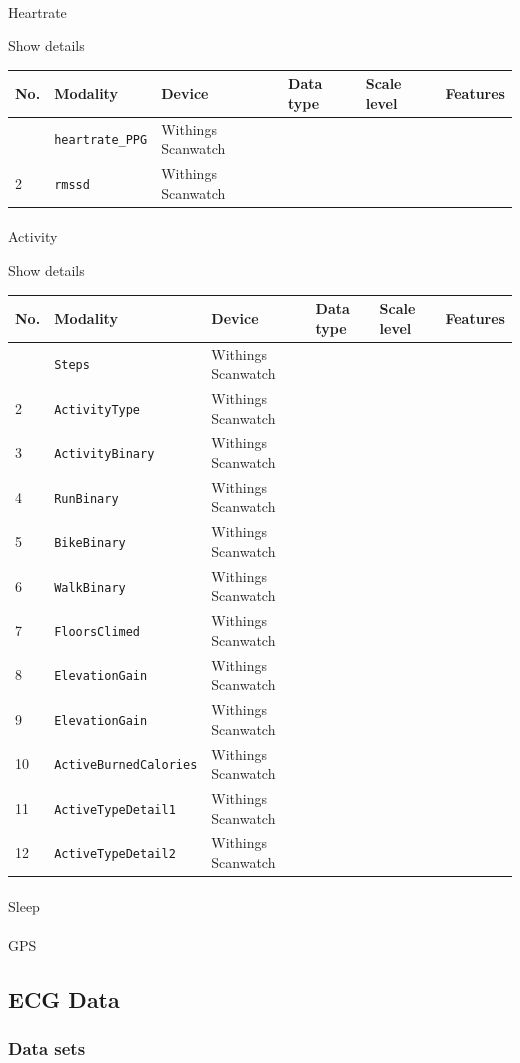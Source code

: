 \documentclass[
  letterpaper,
  DIV=11,
  numbers=noendperiod]{scrartcl}
\makeatletter
\let\oldparagraph\paragraph
\renewcommand{\paragraph}{
    \@ifstar
      \xxxParagraphStar
      \xxxParagraphNoStar
  }
\newcommand{\xxxParagraphStar}[1]{\oldparagraph*{#1}\mbox{}}
\newcommand{\xxxParagraphNoStar}[1]{\oldparagraph{#1}\mbox{}}
\makeatother
\begin{document}
\paragraph{Heartrate}\label{heartrate}

Show details

\begin{longtable}[]{@{}llllll@{}}
\toprule\noalign{}
No. & Modality & Device & Data type & Scale level & Features \\
\midrule\noalign{}
\endhead
\bottomrule\noalign{}
\endlastfoot
1 & \texttt{heartrate\_PPG} & Withings Scanwatch & & & \\
2 & \texttt{rmssd} & Withings Scanwatch & & & \\
\end{longtable}

\paragraph{Activity}\label{activity}

Show details

\begin{longtable}[]{@{}llllll@{}}
\toprule\noalign{}
No. & Modality & Device & Data type & Scale level & Features \\
\midrule\noalign{}
\endhead
\bottomrule\noalign{}
\endlastfoot
1 & \texttt{Steps} & Withings Scanwatch & & & \\
2 & \texttt{ActivityType} & Withings Scanwatch & & & \\
3 & \texttt{ActivityBinary} & Withings Scanwatch & & & \\
4 & \texttt{RunBinary} & Withings Scanwatch & & & \\
5 & \texttt{BikeBinary} & Withings Scanwatch & & & \\
6 & \texttt{WalkBinary} & Withings Scanwatch & & & \\
7 & \texttt{FloorsClimed} & Withings Scanwatch & & & \\
8 & \texttt{ElevationGain} & Withings Scanwatch & & & \\
9 & \texttt{ElevationGain} & Withings Scanwatch & & & \\
10 & \texttt{ActiveBurnedCalories} & Withings Scanwatch & & & \\
11 & \texttt{ActiveTypeDetail1} & Withings Scanwatch & & & \\
12 & \texttt{ActiveTypeDetail2} & Withings Scanwatch & & & \\
\end{longtable}

\paragraph{Sleep}\label{sleep}

\paragraph{GPS}\label{gps}

\subsection{ECG Data}\label{ecg-data}

\subsubsection{Data sets}\label{data-sets-2}
\end{document}
